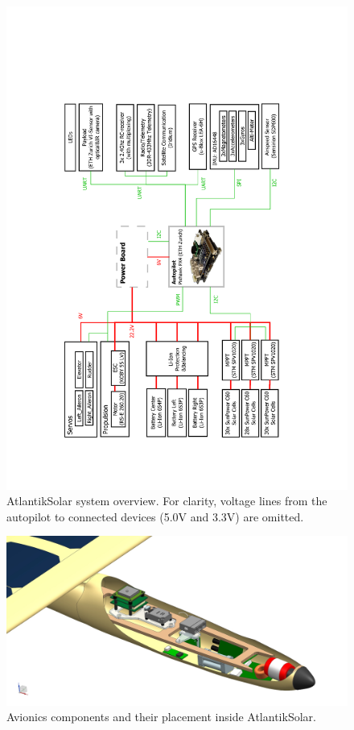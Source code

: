 \begin{figure}[tb]
    \centering
     \includegraphics[width=\linewidth]{images/8_AtlantikSolar_Avionics}
    \caption{AtlantikSolar system overview. For clarity, voltage lines from the autopilot to connected devices (5.0V and 3.3V) are omitted.}
    \label{fig:AtlantikSolar_SystemOverview}
\end{figure}

\begin{figure}[tb]
    \centering
    \includegraphics[width=\linewidth]{images/9_CAD_AtlantikSolarAvionics}
    \caption{Avionics components and their placement inside AtlantikSolar.}
    \label{fig:9_CAD_AtlantikSolarAvionics}
\end{figure}


